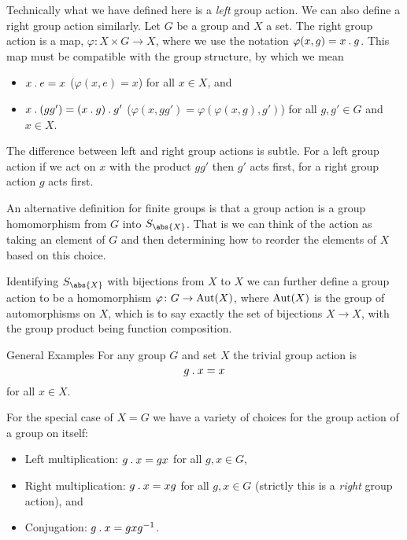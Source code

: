 \begin{rmk}
    Technically what we have defined here is a \emph{left} group action.
    We can also define a right group action similarly.
    Let \(G\) be a group and \(X\) a set.
    The right group action is a map, \(\varphi\colon X \times G \to X\), where we use the notation \(\varphi(x, g) = x\mathbin{.} g\). 
    This map must be compatible with the group structure, by which we mean
    \begin{itemize}
        \item \(x \mathbin{.} e = x\) (\(\varphi(x, e) = x\)) for all \(x \in X\), and
        \item \(x \mathbin{.} (gg') = (x \mathbin{.} g) \mathbin{.} g'\) (\(\varphi(x, gg') = \varphi(\varphi(x, g), g')\)) for all \(g, g' \in G\) and \(x \in X\).
    \end{itemize}
    The difference between left and right group actions is subtle.
    For a left group action if we act on \(x\) with the product \(gg'\) then \(g'\) acts first, for a right group action \(g\) acts first.
\end{rmk}

An alternative definition for finite groups is that a group action is a group homomorphism from \(G\) into \(S_{\abs{X}}\).
That is we can think of the action as taking an element of \(G\) and then determining how to reorder the elements of \(X\) based on this choice.

Identifying \(S_{\abs{X}}\) with bijections from \(X\) to \(X\) we can further define a group action to be a homomorphism \(\varphi \colon G \to \operatorname{Aut}(X)\), where \(\operatorname{Aut}(X)\) is the group of automorphisms on \(X\), which is to say exactly the set of bijections \(X \to X\), with the group product being function composition.

\begin{exm}{General Examples}{}
    For any group \(G\) and set \(X\) the trivial group action is
    \begin{equation}
        g\mathbin{.} x = x
    \end{equation}
    for all \(x \in X\).
    
    For the special case of \(X = G\) we have a variety of choices for the group action of a group on itself:
    \begin{itemize}
        \item Left multiplication: \(g\mathbin{.} x = gx\) for all \(g, x \in G\),
        \item Right multiplication: \(g\mathbin{.} x = xg\) for all \(g, x \in G\) (strictly this is a \emph{right} group action), and
        \item Conjugation: \(g\mathbin{.} x = gxg^{-1}\).
    \end{itemize}
\end{exm}

